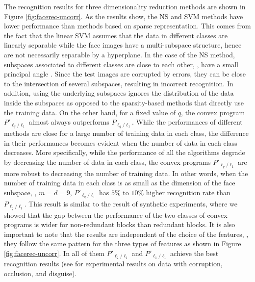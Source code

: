 \documentclass[10pt,twocolumn,twoside] {IEEEtran}
\begin{document}
{The recognition results for three dimensionality reduction methods are shown in Figure \ref{fig:facerec-uncorr}. As the results show, the NS and SVM methods have lower performance than methods based on sparse representation. This comes from the fact that the linear SVM assumes that the data in different classes are linearly separable while the face images have a multi-subspace structure, hence are not necessarily separable by a hyperplane. In the case of the NS method, subspaces associated to different classes are close to each other, {}, have a small principal angle \cite{Elhamifar:TPAMI12}. Since the test images are corrupted by errors, they can be close to the intersection of several subspaces, resulting in incorrect recognition. In addition, using the underlying subspaces ignores the distribution of the data inside the subspaces as opposed to the sparsity-based methods that directly use the training data. On the other hand, for a fixed value of $q$, the convex program $P'_{\ell_q/\ell_1}$ almost always outperforms $P_{\ell_q/\ell_1}$. While the performances of different methods are close for a large number of training data in each class, the difference in their performances becomes evident when the number of data in each class decreases. More specifically, while the performance of all the algorithms degrade by decreasing the number of data in each class, the convex programs $P'_{\ell_q/\ell_1}$ are more robust to decreasing the number of training data. In other words, when the number of training data in each class is as small as the dimension of the face subspace, {}, $m = d = 9$, $P'_{\ell_q/\ell_1}$ has $5\%$ to $10\%$ higher recognition rate than $P_{\ell_q/\ell_1}$. This result is similar to the result of synthetic experiments, where we showed that the gap between the performance of the two classes of convex programs is wider for non-redundant blocks than redundant blocks. It is also important to note that the results are independent of the choice of the features, {}, they follow the same pattern for the three types of features as shown in Figure \ref{fig:facerec-uncorr}. In all of them $P'_{\ell_2/\ell_1}$ and $P'_{\ell_1/\ell_1}$ achieve the best recognition results (see \cite{Elhamifar:CVPR11} for experimental results on data with corruption, occlusion, and disguise). 

}
\end{document}
